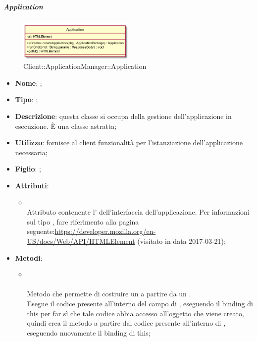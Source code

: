 \hypertarget{Application_label}{\subparagraph{Application}}
\begin{figure}[h]
	\centering
	\includegraphics[width=0.50\textwidth,height=\textheight,keepaspectratio]{images/ClassApplication.png}
	\caption{Client::ApplicationManager::Application}
\end{figure}
\begin{itemize}
	\item \textbf{Nome}: ;
	\item \textbf{Tipo}: ;
	\item \textbf{Descrizione}: questa classe si occupa della gestione dell'applicazione in esecuzione. È una classe astratta;
	\item \textbf{Utilizzo}: fornisce al client funzionalità per l'istanziazione dell'applicazione necessaria;
	\item \textbf{Figlio}: ;
	\item \textbf{Attributi}:
	\begin{itemize}
		\item[]  \\
		Attributo contenente l' dell'interfaccia dell'applicazione. Per informazioni sul tipo , fare riferimento alla pagina seguente:\url{https://developer.mozilla.org/en-US/docs/Web/API/HTMLElement}  (visitato in data 2017-03-21);
	\end{itemize}
	\item \textbf{Metodi}:
	\begin{itemize}
		\item[] \\ \\		Metodo che permette di costruire un  a partire da un . \\
		Esegue il codice presente all'interno del campo  di , eseguendo il binding di this per far sì che tale codice abbia accesso all'oggetto che viene creato, quindi crea il metodo  a partire dal codice presente all'interno di , eseguendo nuovamente il binding di this;\\

\end{itemize}
\end{itemize}
